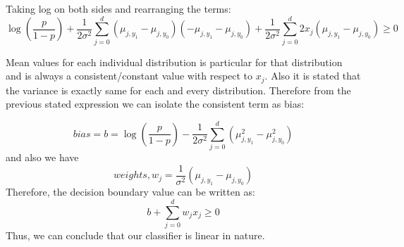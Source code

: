 Taking log on both sides and rearranging the terms:
\[\log(\dfrac{p}{1-p}) + \dfrac{1}{2\sigma^2}\sum_{j=0}^d (\mu_{j,y_1} - \mu_{j,y_0})(-\mu_{j,y_1} - \mu_{j,y_0}) + \dfrac{1}{2\sigma^2} \sum_{j=0}^d 2x_j (\mu_{j,y_1} - \mu_{j,y_0}) \geq 0\]
	
Mean values for each individual distribution is particular for that distribution and is always a consistent/constant value with respect to $x_j$. Also it is stated that the variance is exactly same for each and every distribution. Therefore from the previous stated expression we can isolate the consistent term as bias: 

	\[bias = b = \log(\dfrac{p}{1-p}) - \dfrac{1}{2\sigma^2}\sum_{j=0}^d (\mu_{j,y_1}^2 - \mu_{j,y_0}^2)\]
and also we have
	\[weights, w_j = \dfrac{1}{\sigma^2}(\mu_{j,y_1} - \mu_{j,y_0})\]
	Therefore, the decision boundary value can be written as:
	\[b + \sum_{j=0}^d w_jx_j \geq 0\]
	Thus, we can conclude that our classifier is linear in nature.


